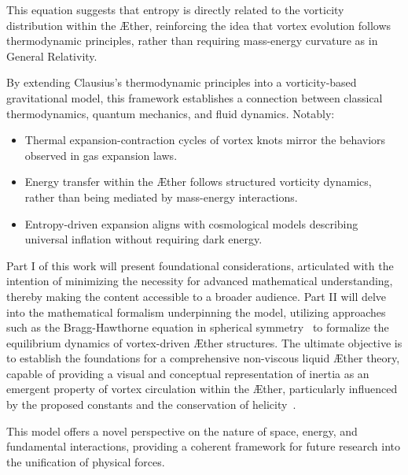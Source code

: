 This equation suggests that entropy is directly related to the vorticity distribution within the \AE ther, reinforcing the idea that vortex evolution follows thermodynamic principles, rather than requiring mass-energy curvature as in General Relativity.

By extending Clausius’s thermodynamic principles into a vorticity-based gravitational model, this framework establishes a connection between classical thermodynamics, quantum mechanics, and fluid dynamics. Notably:

\begin{itemize}
    \item Thermal expansion-contraction cycles of vortex knots mirror the behaviors observed in gas expansion laws.
    \item Energy transfer within the \AE ther follows structured vorticity dynamics, rather than being mediated by mass-energy interactions.
    \item Entropy-driven expansion aligns with cosmological models describing universal inflation without requiring dark energy.
\end{itemize}

Part I of this work will present foundational considerations, articulated with the intention of minimizing the necessity for advanced mathematical understanding, thereby making the content accessible to a broader audience.
Part II will delve into the mathematical formalism underpinning the model, utilizing approaches such as the Bragg-Hawthorne equation in spherical symmetry~\cite{keller2024} to formalize the equilibrium dynamics of vortex-driven \AE ther structures.
The ultimate objective is to establish the foundations for a comprehensive non-viscous liquid \AE ther theory, capable of providing a visual and conceptual representation of inertia as an emergent property of vortex circulation within the \AE ther, particularly influenced by the proposed constants and the conservation of helicity~\cite{kleckner2016}.

This model offers a novel perspective on the nature of space, energy, and fundamental interactions, providing a coherent framework for future research into the unification of physical forces.